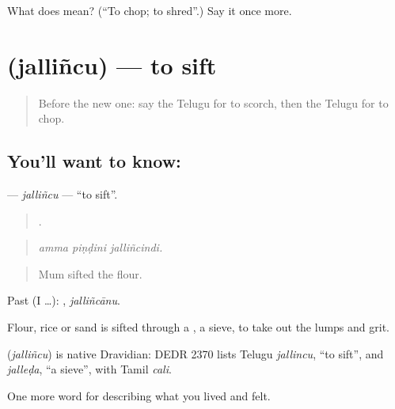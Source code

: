 \begin{tcolorbox}[breakable,colback=teal!4,colframe=teal!35!black,title={Before you move on}]
What does  mean? (\textquotedblleft{}To chop; to shred\textquotedblright{}.) Say it once more.
\end{tcolorbox}
\section[\texorpdfstring{\te{జల్లించు} (jalliñcu)}{జల్లించు (jalliñcu)}]{ (jalliñcu) — to sift}

\label{lesson:TE-C548-jallincu}



\begin{quote}
Before the new one: say the Telugu for to scorch, then the Telugu for to chop.
\end{quote}

\subsection*{You'll want to know: }
\textbf{} — \emph{jalliñcu} — \textquotedblleft{}to sift\textquotedblright{}.

\begin{quote}
  .
\end{quote}

\begin{quote}
\emph{amma piṇḍini jalliñcindi.}
\end{quote}

\begin{quote}
Mum sifted the flour.
\end{quote}

Past (I …): , \emph{jalliñcānu}.

Flour, rice or sand is sifted through a , a sieve, to take out the lumps and grit.

\begin{cousinweb}
\textbf{} (\emph{jalliñcu}) is native Dravidian: DEDR 2370 lists Telugu \emph{jallincu}, \textquotedblleft{}to sift\textquotedblright{}, and \emph{jalleḍa}, \textquotedblleft{}a sieve\textquotedblright{}, with Tamil \emph{cali}.
\end{cousinweb}

\begin{grammarlens}[title={What you've built}]
One more word for describing what you lived and felt.
\end{grammarlens}

